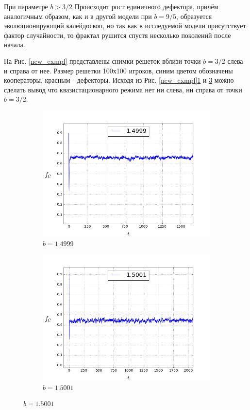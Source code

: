 \documentclass[a4paper]{article}
\begin{document}
	\par При параметре $b>3/2$ Происходит рост единичного дефектора, причём аналогичным образом, как и в другой модели при $b=9/5$, образуется эволюционирующий калейдоскоп, но так как в исследуемой модели присутствует фактор случайности, то фрактал рушится спустя несколько поколений после начала.
	
	
	\par На Рис. \ref{new_exmpl} представлены снимки решеток вблизи точки $b=3/2$ слева и справа от нее. Размер решетки 100х100 игроков, синим цветом обозначены кооператоры, красным - дефекторы. Исходя из Рис. \ref{new_exmpl}\ref{newf_left} и \ref{newf_right} можно сделать вывод что квазистационарного режима нет ни слева, ни справа от точки $b=3/2$.
	\begin{figure}[H]
		\centering
		\begin{subfigure}{.5\textwidth}
			\includegraphics[width=1\linewidth]{f1.4999.png}
			\caption{$b=1.4999$}
			\label{newf_left}
		\end{subfigure}%
		\begin{subfigure}{.5\textwidth}
			\includegraphics[width=1\linewidth]{f1.5001.png}
			\caption{$b=1.5001$}
			\label{newf_right}			
		\end{subfigure}%
	

\end{figure}
\end{document}
